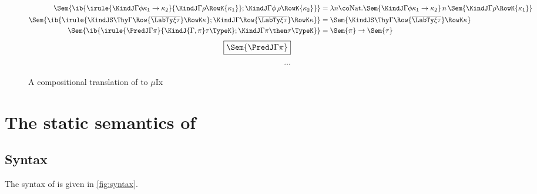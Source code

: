 \documentclass[12pt]{article}
\newcommand\Nat{\mathrm{Nat}}
\newcommand\MuIx{\ensuremath{\mu}Ix}
\begin{document}
\begin{figure}[H]
\begin{align*}
\Sem{\ib{\irule
          {\KindJ \Gamma \phi {\kappa_1 \to \kappa_2}}
          {\KindJ \Gamma \rho {\RowK{\kappa_1}}};
          {\KindJ \Gamma {\phi\,\rho} {\RowK{\kappa_2}}}}} &= \lambda n \co \Nat. \Sem{{\KindJ \Gamma \phi {\kappa_1 \to \kappa_2}}} \, n \, \Sem{{\KindJ \Gamma \rho {\RowK{\kappa_1}}}} \\
\Sem{\ib{\irule
          {\KindJS \Thy \Gamma {\Row {\overline {\LabTy \xi \tau}}} {\RowK \kappa}};
          {\KindJ \Gamma {\Row{\overline {\LabTy \xi \tau}}} {\RowK\kappa}}}} &= \Sem{\KindJS \Thy \Gamma {\Row {\overline {\LabTy \xi \tau}}} {\RowK \kappa}} \\
\Sem{\ib{\irule
          {\PredJ \Gamma \pi}
          {\KindJ {\Gamma, \pi} \tau \TypeK};
          {\KindJ \Gamma {\pi \then \tau} \TypeK}}} &= \Sem{\pi} \to \Sem{\tau}
\end{align*}
\begin{align*}
\fbox{$\Sem{\PredJ \Gamma \pi}$} \\
\vspace{5em}
...
\end{align*}
\caption{A compositional translation of \RO to \MuIx{}}
\label{fig:translation}
\end{figure}




\appendix

\section{The static semantics of \RO}
\label{app:RO}

\subsection{Syntax}
\label{sec:ro-syntax}

The syntax of \RO [\Thy] is given in \cref{fig:syntax}.  
\end{document}
